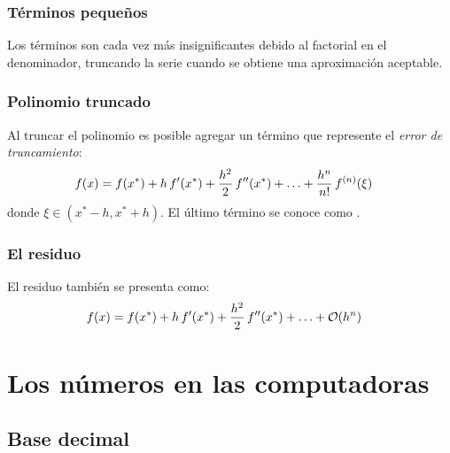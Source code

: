 \documentclass[12pt]{beamer}
\begin{document}
\begin{frame}
\frametitle{Términos pequeños}
Los términos son cada vez más insignificantes debido al factorial en el denominador, \pause truncando la serie cuando se obtiene una aproximación aceptable.
\end{frame}
\begin{frame}
\frametitle{Polinomio truncado}
Al truncar el polinomio es posible agregar un término que represente el \emph{error de truncamiento}:
\pause
\begin{align*}
f (x) = f (x^{*}) + h \, {f}^{\prime} (x^{*}) &+ \dfrac{h^{2}}{2} \, {f}^{\prime \prime} (x^{*}) +  \ldots + \dfrac{h^{n}}{n!} \, {f}^{(n)} (\xi)
\end{align*}
donde $\xi \in (x^{*} - h, x^{*} + h)$. \pause El último término se conoce como .
\end{frame}
\begin{frame}
\frametitle{El residuo}
El residuo también se presenta como:
\pause
\begin{align*}
f (x) = f (x^{*}) + h \, \pderivada{f} (x^{*}) &+ \dfrac{h^{2}}{2} \, \sderivada{f} (x^{*}) +  \ldots + \order{h^{n}}
\end{align*}	
\end{frame}

\section{Los números en las computadoras}
\subsection{Base decimal}
\end{document}
